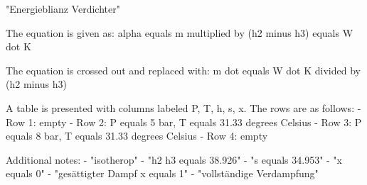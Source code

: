 "Energieblianz Verdichter"

The equation is given as:
alpha equals m multiplied by (h2 minus h3) equals W dot K

The equation is crossed out and replaced with:
m dot equals W dot K divided by (h2 minus h3)

A table is presented with columns labeled P, T, h, s, x. The rows are as follows:
- Row 1: empty
- Row 2: P equals 5 bar, T equals 31.33 degrees Celsius
- Row 3: P equals 8 bar, T equals 31.33 degrees Celsius
- Row 4: empty

Additional notes:
- "isotherop"
- "h2 h3 equals 38.926"
- "s equals 34.953"
- "x equals 0"
- "gesättigter Dampf x equals 1"
- "vollständige Verdampfung"